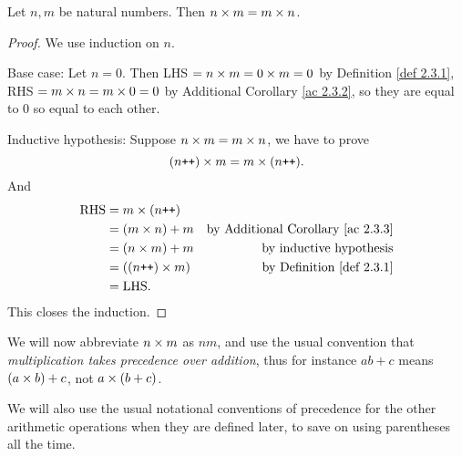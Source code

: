 \begin{lemma}\label{lem 2.3.2}
Let \(n, m\) be natural numbers. Then \(n \times m = m \times n\).
\end{lemma}
\begin{proof}
We use induction on \(n\).

Base case: Let \(n = 0\). Then LHS \(= n \times m = 0 \times m = 0\) by Definition \ref{def 2.3.1}, RHS \(= m \times n = m \times 0 = 0\) by Additional Corollary \ref{ac 2.3.2}, so they are equal to \(0\) so equal to each other.

Inductive hypothesis: Suppose \(n \times m = m \times n\), we have to prove
\[(n\texttt{++}) \times m = m \times (n\texttt{++}).\]
And
\begin{align*}
    \text{RHS} & = m \times (n\texttt{++}) \\
               & = (m \times n) + m & \text{by Additional Corollary \ref{ac 2.3.3}} \\
               & = (n \times m) + m & \text{by inductive hypothesis} \\
               & = ((n\texttt{++}) \times m) & \text{by Definition \ref{def 2.3.1}} \\
               & = \text{LHS.}
\end{align*}
This closes the induction.
\end{proof}

\begin{note}
We will now abbreviate \(n \times m\) as \(nm\), and use the usual convention that \emph{multiplication takes precedence over addition}, thus for instance \(ab + c\) means \((a \times b)+ c\), not \(a \times (b + c)\).

We will also use the usual notational conventions of precedence for the other arithmetic operations when they are defined later, to save on using parentheses all the time.
\end{note}